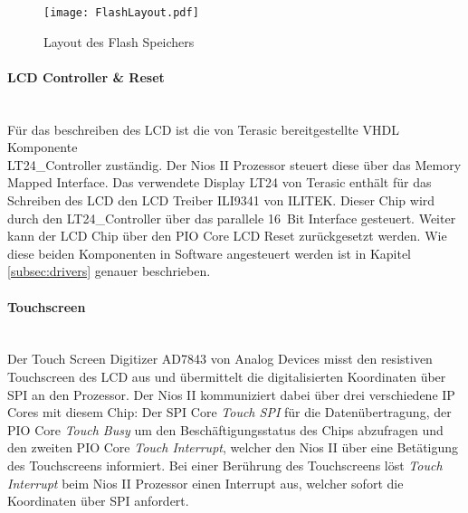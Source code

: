 \begin{figure}[h!]
	\centering
	\texttt{[image: FlashLayout.pdf]}
	\caption{Layout des Flash Speichers} 
	\label{img:FlashLayout}
\end{figure}  

\paragraph{LCD Controller \& Reset}\mbox{}\\

Für das beschreiben des LCD ist die von Terasic bereitgestellte VHDL Komponente\\ LT24\_Controller zuständig. Der Nios II Prozessor steuert diese über das Memory Mapped Interface. Das verwendete Display LT24 von Terasic enthält für das Schreiben des LCD den LCD Treiber ILI9341 von ILITEK. Dieser Chip wird durch den LT24\_Controller über das parallele \SI{16}{Bit} Interface gesteuert. Weiter kann der LCD Chip über den PIO Core LCD Reset zurückgesetzt werden. Wie diese beiden Komponenten in Software angesteuert werden ist in Kapitel \ref{subsec:drivers} genauer beschrieben. \cite{LCD_Chip}

\newpage

\paragraph{Touchscreen}\mbox{}\\

Der Touch Screen Digitizer AD7843 von Analog Devices misst den resistiven Touchscreen des LCD aus und übermittelt die digitalisierten Koordinaten über SPI an den Prozessor. Der Nios II kommuniziert dabei über drei verschiedene IP Cores mit diesem Chip: Der SPI Core \textit{Touch SPI} für die Datenübertragung, der PIO Core \textit{Touch Busy} um den Beschäftigungsstatus des Chips abzufragen und den zweiten PIO Core \textit{Touch Interrupt}, welcher den Nios II über eine Betätigung des Touchscreens informiert. Bei einer Berührung des Touchscreens löst \textit{Touch Interrupt} beim Nios II Prozessor einen Interrupt aus, welcher sofort die Koordinaten über SPI anfordert. \cite{Touch_ADC}